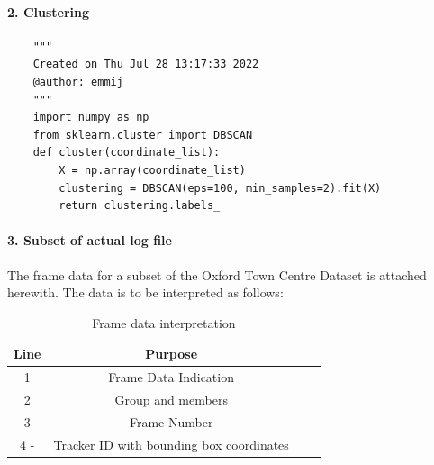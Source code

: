 \documentclass{fisatprojectfinal}
\begin{document}
\begin{appendices}
\paragraph{2. Clustering}
\begin{verbatim}
    """
    Created on Thu Jul 28 13:17:33 2022
    @author: emmij
    """
    import numpy as np
    from sklearn.cluster import DBSCAN
    def cluster(coordinate_list):
        X = np.array(coordinate_list)
        clustering = DBSCAN(eps=100, min_samples=2).fit(X)
        return clustering.labels_
\end{verbatim}
\end{appendices}

\paragraph{3. Subset of actual log file}
The frame data for a subset of the Oxford Town Centre Dataset is attached herewith. The data is to be interpreted as follows:

\begin{table}[h!]
\begin{center}
	\caption{Frame data interpretation} 
\vspace{0.25in}
\begin{tabular}{|c|c|c|c|}
	
\hline Line & Purpose \\ 
\hline 1 & Frame Data Indication\\
\hline 2 & Group and members\\
\hline 3 & Frame Number\\
\hline 4 - & Tracker ID with bounding box coordinates\\
\hline
\end{tabular}
\end{center}
\end{table}
\end{document}
